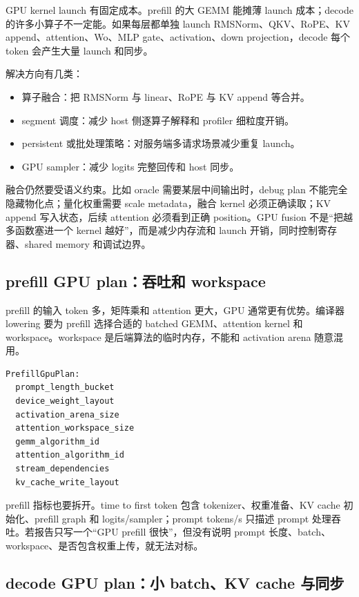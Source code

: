 GPU kernel launch 有固定成本。prefill 的大 GEMM 能摊薄 launch 成本；decode 的许多小算子不一定能。如果每层都单独 launch RMSNorm、QKV、RoPE、KV append、attention、Wo、MLP gate、activation、down projection，decode 每个 token 会产生大量 launch 和同步。

解决方向有几类：

\begin{itemize}
  \item 算子融合：把 RMSNorm 与 linear、RoPE 与 KV append 等合并。
  \item segment 调度：减少 host 侧逐算子解释和 profiler 细粒度开销。
  \item persistent 或批处理策略：对服务端多请求场景减少重复 launch。
  \item GPU sampler：减少 logits 完整回传和 host 同步。
\end{itemize}

融合仍然要受语义约束。比如 oracle 需要某层中间输出时，debug plan 不能完全隐藏物化点；量化权重需要 scale metadata，融合 kernel 必须正确读取；KV append 写入状态，后续 attention 必须看到正确 position。GPU fusion 不是“把越多函数塞进一个 kernel 越好”，而是减少内存流和 launch 开销，同时控制寄存器、shared memory 和调试边界。

\subsection{prefill GPU plan：吞吐和 workspace}

prefill 的输入 token 多，矩阵乘和 attention 更大，GPU 通常更有优势。编译器 lowering 要为 prefill 选择合适的 batched GEMM、attention kernel 和 workspace。workspace 是后端算法的临时内存，不能和 activation arena 随意混用。

\begin{lstlisting}[numbers=none,caption={prefill GPU plan 的主要字段}]
PrefillGpuPlan:
  prompt_length_bucket
  device_weight_layout
  activation_arena_size
  attention_workspace_size
  gemm_algorithm_id
  attention_algorithm_id
  stream_dependencies
  kv_cache_write_layout
\end{lstlisting}

prefill 指标也要拆开。time to first token 包含 tokenizer、权重准备、KV cache 初始化、prefill graph 和 logits/sampler；prompt tokens/s 只描述 prompt 处理吞吐。若报告只写一个“GPU prefill 很快”，但没有说明 prompt 长度、batch、workspace、是否包含权重上传，就无法对标。

\subsection{decode GPU plan：小 batch、KV cache 与同步}

